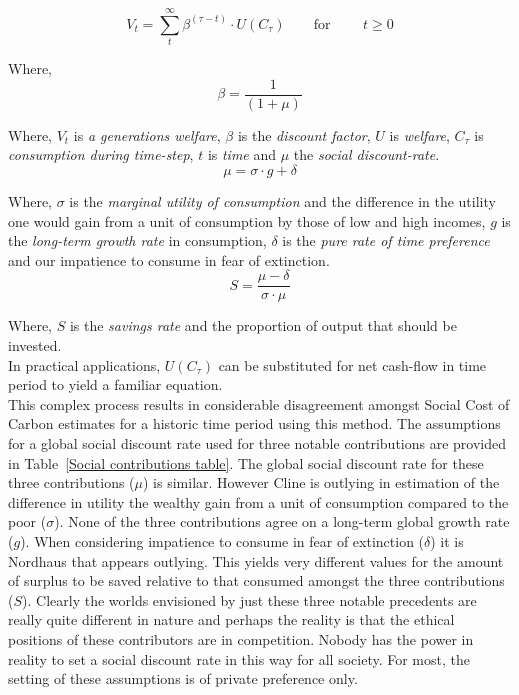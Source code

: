 \documentclass[11pt, oneside]{article}   	%
\begin{document}
\begin{equation}
V_t = \sum_t^\infty \beta^{(\tau - t)} \cdot U (C_\tau)
\qquad \text{for }
\qquad t \geq 0
\end{equation}

Where,
\begin{equation}
\beta = \frac{1}{(1+\mu)}
\end{equation}

Where, $V_t$ is \emph{a generations welfare}, $\beta$ is the \emph{discount factor}, $U$ is \emph{welfare}, $C_\tau$ is \emph{consumption during time-step}, $t$ is \emph{time} and $\mu$ the \emph{social discount-rate}.\\

\begin{equation}
\mu = \sigma \cdot g + \delta
\end{equation}

Where, $\sigma$ is the \emph{marginal utility of consumption} and the difference in the utility one would gain from a unit of consumption by those of low and high incomes, $g$ is the \emph{long-term growth rate} in consumption, $\delta$ is the \emph{pure rate of time preference} and our impatience to consume in fear of extinction.\\

\begin{equation}
S = \frac{\mu-\delta}{\sigma \cdot \mu}
\end{equation}

Where, $S$ is the \emph{savings rate} and the proportion of output that should be invested.\\

In practical applications, $U (C_\tau)$ can be substituted for net cash-flow in time period to yield a familiar equation.\\

This complex process results in considerable disagreement amongst Social Cost of Carbon estimates for a historic time period using this method.
The assumptions for a global social discount rate used for three notable contributions are provided in Table~\ref{Social contributions table}.
The global social discount rate for these three contributions ($\mu$) is similar.
However Cline is outlying in estimation of the difference in utility the wealthy gain from a unit of consumption compared to the poor ($\sigma$).
None of the three contributions agree on a long-term global growth rate ($g$).
When considering impatience to consume in fear of extinction ($\delta$) it is Nordhaus that appears outlying.
This yields very different values for the amount of surplus to be saved relative to that consumed amongst the three contributions ($S$).
Clearly the worlds envisioned by just these three notable precedents are really quite different in nature and perhaps the reality is that the ethical positions of these contributors are in competition.
Nobody has the power in reality to set a social discount rate in this way for all society.
For most, the setting of these assumptions is of private preference only.\\
\end{document}
